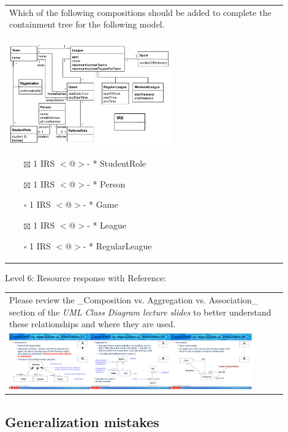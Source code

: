 \begin{tabular}{|p{0.9\linewidth}}

Which of the following compositions should be added to complete the containment tree for the
following model.

\\
\includegraphics[width=0.6\textwidth]{images/IRS.png}

\begin{itemize}
    \item[$\boxtimes$] 1 IRS $<$@$>$- * StudentRole
    \item[$\boxtimes$] 1 IRS $<$@$>$- * Person
    \item[$\square$] 1 IRS $<$@$>$- * Game
    \item[$\boxtimes$] 1 IRS $<$@$>$- * League
    \item[$\square$] 1 IRS $<$@$>$- * RegularLeague
\end{itemize}

\end{tabular} \medskip

\noindent Level 6: Resource response with Reference: \medskip

\begin{tabular}{|p{0.9\linewidth}}
Please review the _Composition vs. Aggregation vs. Association_ section of 
the \textit{UML Class Diagram lecture slides} to 
better understand these relationships and where they are used.

\\
\includegraphics[width=0.9\textwidth]{images/composition_aggregation_association.png}
\end{tabular} \medskip


\subsection{Generalization mistakes}

